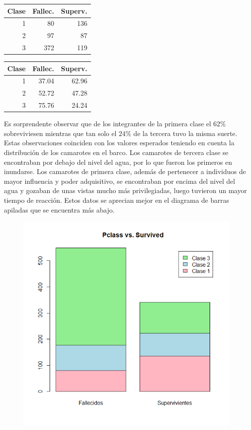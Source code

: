 \documentclass{article}
\begin{document}
\begin{table}[htbp]
    \centering
    \begin{minipage}{.5\textwidth}
        \centering
        \begin{tabular}{rrr}
              \hline
             Clase & Fallec. & Superv. \\ 
              \hline
            1 &  80 & 136 \\ 
              2 &  97 &  87 \\ 
              3 & 372 & 119 \\ 
               \hline
        \end{tabular}
    \end{minipage}%
    \begin{minipage}{.5\textwidth}
        \centering
        \begin{tabular}{rrr}
              \hline
             Clase & Fallec. & Superv. \\ 
              \hline
            1 & 37.04 & 62.96 \\ 
              2 & 52.72 & 47.28 \\ 
              3 & 75.76 & 24.24 \\ 
               \hline
        \end{tabular}
    \end{minipage}
\end{table}
\noindent Es sorprendente observar que de los integrantes de la primera clase el $62\%$ sobreviviesen mientras que tan solo el $24\%$ de la tercera tuvo la misma suerte. Estas observaciones coinciden con los valores esperados teniendo en cuenta la distribución de los camarotes en el barco. Los camarotes de tercera clase se encontraban por debajo del nivel del agua, por lo que fueron los primeros en inundarse. Los camarotes de primera clase, además de pertenecer a individuos de mayor influencia y poder adquisitivo, se encontraban por encima del nivel del agua y gozaban de unas vistas mucho más privilegiadas, luego tuvieron un mayor tiempo de reacción. Estos datos se aprecian mejor en el diagrama de barras apiladas que se encuentra más abajo.
\newpage
\begin{figure}[!h]
    \centering
    \includegraphics[width=0.7\linewidth]{content/class_surv.png}
\end{figure}
\end{document}
